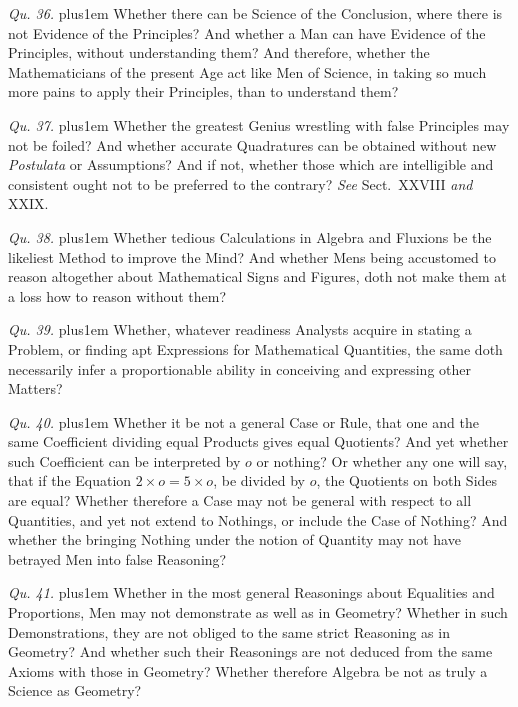 \item{\it Qu. 36.} \hskip 0pt plus1em
Whether there can be Science of the Conclusion, where there is
not Evidence of the Principles?  And whether a Man can have
Evidence of the Principles, without understanding them?  And
therefore, whether the Mathematicians of the present Age act like
Men of Science, in taking so much more pains to apply their
Principles, than to understand them?


\item{\it Qu. 37.} \hskip 0pt plus1em
Whether the greatest Genius wrestling with false Principles may
not be foiled?  And whether accurate Quadratures can be obtained
without new {\it Postulata\/} or Assumptions?  And if not,
whether those which are intelligible and consistent ought not to
be preferred to the contrary?
{\it See\/} Sect.\ XXVIII {\it and\/} XXIX.

\item{\it Qu. 38.} \hskip 0pt plus1em
Whether tedious Calculations in Algebra and Fluxions be the
likeliest Method to improve the Mind?  And whether Mens being
accustomed to reason altogether about Mathematical Signs and
Figures, doth not make them at a loss how to reason without them?

\item{\it Qu. 39.} \hskip 0pt plus1em
Whether, whatever readiness Analysts acquire in stating a
Problem, or finding apt Expressions for Mathematical Quantities,
the same doth necessarily infer a proportionable ability in
conceiving and expressing other Matters?

\item{\it Qu. 40.} \hskip 0pt plus1em
Whether it be not a general Case or Rule, that one and the same
Coefficient dividing equal Products gives equal Quotients?  And
yet whether such Coefficient can be interpreted by $o$ or
nothing?  Or whether any one will say, that if the Equation
$2 \times o = 5 \times o$, be divided by $o$, the Quotients on
both Sides are equal?  Whether therefore a Case may not be
general with respect to all Quantities, and yet not extend to
Nothings, or include the Case of Nothing?  And whether the
bringing Nothing under the notion of Quantity may not have
betrayed Men into false Reasoning?

\item{\it Qu. 41.} \hskip 0pt plus1em
Whether in the most general Reasonings about Equalities and
Proportions, Men may not demonstrate as well as in Geometry?
Whether in such Demonstrations, they are not obliged to the same
strict Reasoning as in Geometry?  And whether such their
Reasonings are not deduced from the same Axioms with those in
Geometry?  Whether therefore Algebra be not as truly a Science as
Geometry?

